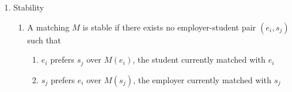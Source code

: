 \documentclass[12pt]{article}
\begin{document}
\begin{enumerate}
\begin{enumerate}
\begin{enumerate}
                \end{enumerate}
            \item Stability
                \begin{enumerate}
                    \item A matching $M$ is stable if there exists no employer-student pair 
                    $(e_i, s_j)$ such that
                    \begin{enumerate}
                        \item $e_i$ prefers $s_j$ over $M(e_i)$, the student currently matched with $e_i$
                        \item $s_j$ prefers $e_i$ over $M(s_j)$, the employer currently matched with $s_j$
                    \end{enumerate}
                \end{enumerate}
        \end{enumerate}
   \end{enumerate}
\end{document}
